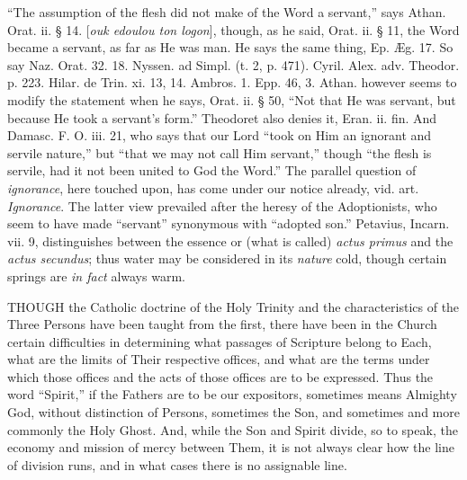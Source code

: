 ``The assumption of the flesh did not make of the
Word a servant,'' says Athan. Orat. ii. § 14. [\emph{ouk edoulou ton
logon}], though, as he said, Orat. ii. § 11, the Word became a
servant, as far as He was man. He says the same thing, Ep. Æg. 17. So
say Naz. Orat. 32. 18. Nyssen. ad Simpl. (t. 2, p. 471). Cyril. Alex.
adv. Theodor. p. 223. Hilar. de Trin. xi. 13, 14. Ambros. 1. Epp. 46,
3. Athan. however seems to modify the statement when he says, Orat.
ii. § 50, ``Not that He was servant, but because He took a servant's
form.'' Theodoret also denies it, Eran. ii. fin. And Damasc. F. O. iii.
21, who says that our Lord ``took on Him an ignorant and servile
nature,'' but ``that we may not call Him servant,'' though ``the flesh is
servile, had it not been united to God the Word.'' The parallel
question of \emph{ignorance}, here touched upon, has come under our
notice already, vid. art. \emph{Ignorance}. The latter view prevailed
after the heresy of the Adoptionists, who seem to have made ``servant''
synonymous with ``adopted son.'' Petavius, Incarn. vii. 9, distinguishes
between the essence or (what is called) \emph{actus primus} and the \emph{actus
secundus}; thus water may be considered in its \emph{nature} cold,
though certain springs are \emph{in fact} always warm.


THOUGH
the Catholic doctrine of the Holy Trinity and the characteristics of
the Three Persons have been taught from the first, there have been in
the Church certain difficulties in determining what passages of
Scripture belong to Each, what are the limits of Their respective
offices, and what are the terms under which those offices and the acts
of those offices are to be expressed. Thus the word ``Spirit,'' if the
Fathers are to be our expositors, sometimes means Almighty God,
without distinction of Persons, sometimes the Son, and sometimes and
more commonly the Holy Ghost. And, while the Son and Spirit divide, so
to speak, the economy and mission of mercy between Them, it is not
always clear how the line of division runs, and in what cases there is
no assignable line.

